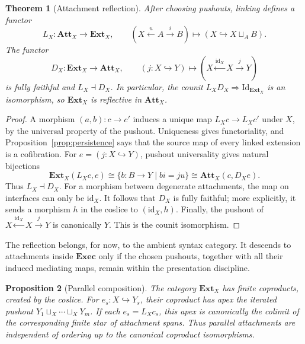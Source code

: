 \documentclass[11pt]{article}
\newtheorem{theorem}{Theorem}[section]
\newtheorem{proposition}[theorem]{Proposition}
\newcommand{\Exec}{\mathbf{Exec}}
\begin{document}
\begin{theorem}[Attachment reflection]\label{thm:attachment-reflection}
After choosing pushouts, linking defines a functor
\[
 L_X:\mathbf{Att}_X\longrightarrow\mathbf{Ext}_X,
 \qquad
 (X\xleftarrow{u}A\xrightarrow{i}B)
 \longmapsto (X\hookrightarrow X\sqcup_A B).
\]
The functor
\[
 D_X:\mathbf{Ext}_X\longrightarrow\mathbf{Att}_X,
 \qquad
 (j:X\hookrightarrow Y)\longmapsto
 (X\xleftarrow{\mathrm{id}_X}X\xrightarrow{j}Y)
\]
is fully faithful and \(L_X\dashv D_X\).  In particular, the counit
\(L_XD_X\Rightarrow\mathrm{Id}_{\mathbf{Ext}_X}\) is an isomorphism, so
\(\mathbf{Ext}_X\) is reflective in \(\mathbf{Att}_X\).
\end{theorem}

\begin{proof}
A morphism \((a,b):c\to c'\) induces a unique map
\(L_Xc\to L_Xc'\) under \(X\), by the universal property of the pushout.
Uniqueness gives functoriality, and Proposition~\ref{prop:persistence} says
that the source map of every linked extension is a cofibration.  For
\(e=(j:X\hookrightarrow Y)\), pushout universality gives natural bijections
\[
 \mathbf{Ext}_X(L_Xc,e)
 \cong\{b:B\to Y\mid bi=ju\}
 \cong\mathbf{Att}_X(c,D_Xe).
\]
Thus \(L_X\dashv D_X\).  For a morphism between degenerate attachments, the
map on interfaces can only be \(\mathrm{id}_X\).  It follows that \(D_X\) is
fully faithful; more explicitly, it sends a morphism \(h\) in the coslice to
\((\mathrm{id}_X,h)\).  Finally, the pushout of
\(X\xleftarrow{\mathrm{id}_X}X\xrightarrow{j}Y\) is canonically \(Y\).
This is the counit isomorphism.
\end{proof}

The reflection belongs, for now, to the ambient syntax category.  It descends
to attachments inside \(\Exec\) only if the chosen pushouts, together with
all their induced mediating maps, remain within the presentation discipline.

\begin{proposition}[Parallel composition]\label{prop:parallel}
The category \(\mathbf{Ext}_X\) has finite coproducts, created by the coslice.
For \(e_s:X\hookrightarrow Y_s\), their coproduct has apex the iterated
pushout \(Y_1\sqcup_X\cdots\sqcup_XY_m\).  If each \(e_s=L_Xc_s\), this apex
is canonically the colimit of the corresponding finite star of attachment
spans.  Thus parallel attachments are independent of ordering up to the
canonical coproduct isomorphisms.
\end{proposition}
\end{document}
